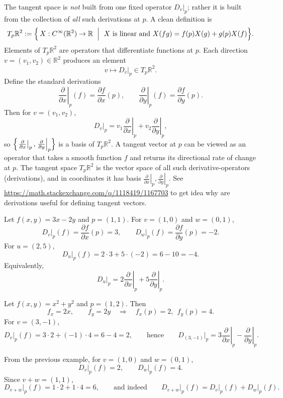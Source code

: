 \medskip
The tangent space is \emph{not} built from one fixed operator $D_v|_p$; rather it is built from the collection of \emph{all} such derivations at $p$. A clean definition is
\[
T_p\mathbb{R}^2
:=\Bigl\{\,X:C^\infty(\mathbb{R}^2)\to\mathbb{R}\ \Bigm|\ 
X \text{ is linear and } X(fg)=f(p)X(g)+g(p)X(f)\Bigr\}.
\]
Elements of $T_p\mathbb{R}^2$ are operators that differentiate functions at $p$.
Each direction $v=(v_1,v_2)\in\mathbb{R}^2$ produces an element
\[
v\longmapsto D_v\big|_p\in T_p\mathbb{R}^2.
\]
\medskip
Define the standard derivations
\[
\left.\frac{\partial}{\partial x}\right|_p(f)=\frac{\partial f}{\partial x}(p),
\qquad
\left.\frac{\partial}{\partial y}\right|_p(f)=\frac{\partial f}{\partial y}(p).
\]
Then for $v=(v_1,v_2)$,
\[
D_v\big|_p
=
v_1\left.\frac{\partial}{\partial x}\right|_p
+
v_2\left.\frac{\partial}{\partial y}\right|_p,
\]
so $\Bigl\{\left.\frac{\partial}{\partial x}\right|_p,\left.\frac{\partial}{\partial y}\right|_p\Bigr\}$
is a basis of $T_p\mathbb{R}^2$.
\medskip
A tangent vector at $p$ can be viewed as an operator that takes a smooth function $f$ 
and returns its directional rate of change at $p$. The tangent space $T_p\mathbb{R}^2$ 
is the vector space of all such derivative-operators (derivations), 
and in coordinates it has basis 
$\left.\frac{\partial}{\partial x}\right|_p,\left.\frac{\partial}{\partial y}\right|_p$. See \url{https://math.stackexchange.com/q/1118419/1167703} to get idea why are derivations useful for defining tangent vectors. 
\begin{example}
  Let $f(x,y)=3x-2y$ and $p=(1,1)$.
For $v=(1,0)$ and $w=(0,1)$,
\[
D_v\big|_p(f)=\frac{\partial f}{\partial x}(p)=3,
\qquad
D_w\big|_p(f)=\frac{\partial f}{\partial y}(p)=-2.
\]
For $u=(2,5)$,
\[
D_u\big|_p(f)=2\cdot 3+5\cdot(-2)=6-10=-4.
\]
Equivalently,
\[
D_u\big|_p
=
2\left.\frac{\partial}{\partial x}\right|_p
+
5\left.\frac{\partial}{\partial y}\right|_p.
\]
\end{example}
\begin{example}
Let $f(x,y)=x^2+y^2$ and $p=(1,2)$. Then
\[
f_x=2x,\qquad f_y=2y
\quad\Rightarrow\quad
f_x(p)=2,\ \ f_y(p)=4.
\]
For $v=(3,-1)$,
\[
D_v\big|_p(f)=3\cdot 2+(-1)\cdot 4=6-4=2,
\qquad\text{hence}\qquad
D_{(3,-1)}\big|_p
=
3\left.\frac{\partial}{\partial x}\right|_p
-
\left.\frac{\partial}{\partial y}\right|_p.
\]
\end{example}
\begin{example}
From the previous example, for $v=(1,0)$ and $w=(0,1)$,
\[
D_v\big|_p(f)=2,\qquad D_w\big|_p(f)=4.
\]
Since $v+w=(1,1)$,
\[
D_{v+w}\big|_p(f)=1\cdot 2+1\cdot 4=6,
\qquad\text{and indeed}\qquad
D_{v+w}\big|_p(f)=D_v\big|_p(f)+D_w\big|_p(f).
\]
\end{example}
